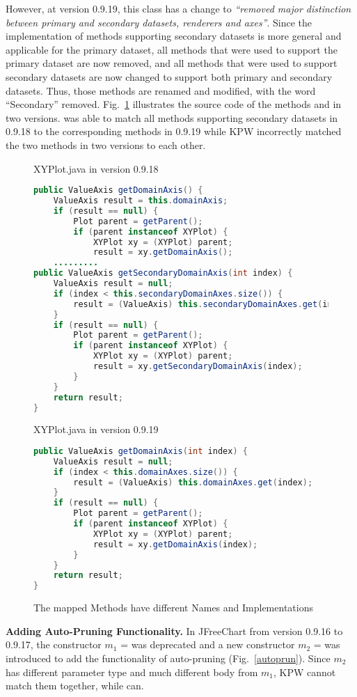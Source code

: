 However, at version 0.9.19, this class has a change to \emph{``removed
major distinction between primary and secondary datasets, renderers
and axes''}. Since the implementation of methods supporting secondary
datasets is more general and applicable for the primary
dataset, all methods that were used to support the primary dataset are
now removed, and all methods that were used to support secondary
datasets are now changed to support both primary and secondary
datasets. Thus, those methods are renamed and modified, with the word
``Secondary'' removed. Fig.~\ref{plot} illustrates the source code
of the methods  and 
in two versions. {\tool} was able to match all methods supporting
secondary datasets in 0.9.18 to the corresponding methods in 0.9.19
while KPW incorrectly matched the two methods  in two versions to
each other.

\begin{figure}[t]
XYPlot.java in version 0.9.18
\begin{lstlisting}[language = Java]
public ValueAxis getDomainAxis() {
	ValueAxis result = this.domainAxis;
	if (result == null) {
		Plot parent = getParent();
		if (parent instanceof XYPlot) {
			XYPlot xy = (XYPlot) parent;
			result = xy.getDomainAxis();
	.........
public ValueAxis getSecondaryDomainAxis(int index) {
	ValueAxis result = null;
	if (index < this.secondaryDomainAxes.size()) {
		result = (ValueAxis) this.secondaryDomainAxes.get(index);
	}
	if (result == null) {
		Plot parent = getParent();
		if (parent instanceof XYPlot) {
			XYPlot xy = (XYPlot) parent;
			result = xy.getSecondaryDomainAxis(index);
		}
	}
	return result;
}
\end{lstlisting}
XYPlot.java in version 0.9.19
\begin{lstlisting}[language = Java]
public ValueAxis getDomainAxis(int index) {
	ValueAxis result = null;
	if (index < this.domainAxes.size()) {
		result = (ValueAxis) this.domainAxes.get(index);
	}
	if (result == null) {
		Plot parent = getParent();
		if (parent instanceof XYPlot) {
			XYPlot xy = (XYPlot) parent;
			result = xy.getDomainAxis(index);
		}
	}
	return result;
}
\end{lstlisting}
\caption{The mapped Methods have different Names and Implementations}
\label{plot}
\end{figure}

\vspace{0.03in} {\bf Adding Auto-Pruning Functionality.} In JFreeChart
from version 0.9.16 to 0.9.17, the constructor $m_1$ =
 was deprecated and a new
constructor $m_2$ =  was
introduced to add the functionality of auto-pruning
(Fig.~\ref{autoprun}). Since $m_2$ has different parameter type and
much different body from $m_1$, KPW cannot match them together, while
{\tool} can.


